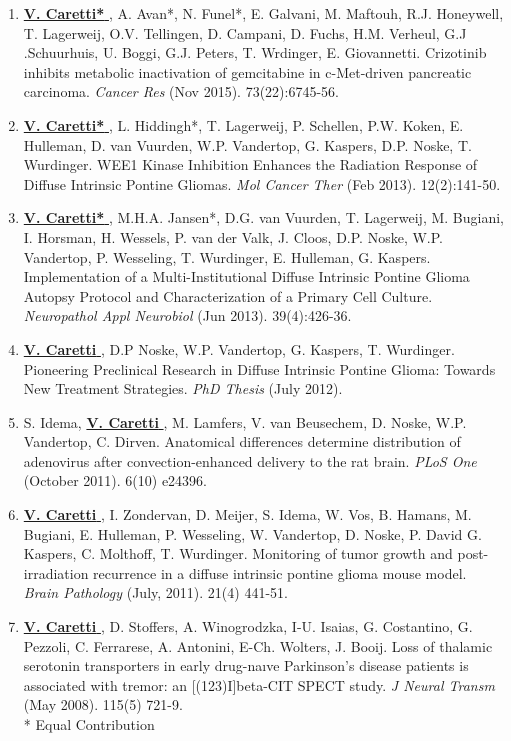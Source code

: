 \documentclass[line,margin]{res}
\newcommand{\namestyle}[1]{\underline{\bf #1 }}
\begin{document}
\begin{resume}
{\begin{enumerate}
\item \namestyle{V. Caretti*}, A. Avan*, N. Funel*, E. Galvani, M. Maftouh, R.J. Honeywell, T. Lagerweij, O.V. Tellingen, D. Campani, D. Fuchs, H.M. Verheul, G.J .Schuurhuis, U. Boggi, G.J. Peters, T. Wrdinger, E. Giovannetti. Crizotinib inhibits metabolic inactivation of gemcitabine in c-Met-driven pancreatic carcinoma. \emph{Cancer Res} (Nov 2015). 73(22):6745-56.
\item \namestyle{V. Caretti*}, L. Hiddingh*, T. Lagerweij, P. Schellen, P.W. Koken, E. Hulleman, D. van Vuurden, W.P. Vandertop, G. Kaspers, D.P. Noske, T. Wurdinger. WEE1 Kinase Inhibition Enhances the Radiation Response of Diffuse Intrinsic Pontine Gliomas. \emph{Mol Cancer Ther} (Feb 2013). 12(2):141-50.
\item \namestyle{V. Caretti*}, M.H.A. Jansen*, D.G. van Vuurden, T. Lagerweij, M. Bugiani, I. Horsman, H. Wessels, P. van der Valk, J. Cloos, D.P. Noske, W.P. Vandertop, P. Wesseling, T. Wurdinger, E. Hulleman, G. Kaspers. Implementation of a Multi-Institutional Diffuse Intrinsic Pontine Glioma Autopsy Protocol and Characterization of a Primary Cell Culture. \emph{Neuropathol Appl Neurobiol} (Jun 2013). 39(4):426-36.
\item \namestyle{V. Caretti}, D.P Noske, W.P. Vandertop, G. Kaspers, T. Wurdinger. Pioneering Preclinical Research in Diffuse Intrinsic Pontine Glioma: Towards New Treatment Strategies. \emph{PhD Thesis} (July 2012).
\item S. Idema, \namestyle{V. Caretti}, M. Lamfers, V. van Beusechem, D. Noske, W.P. Vandertop, C. Dirven. Anatomical differences determine distribution of adenovirus after convection-enhanced delivery to the rat brain. \emph{PLoS One} (October 2011). 6(10) e24396.
\item \namestyle{V. Caretti}, I. Zondervan, D. Meijer, S. Idema, W. Vos, B. Hamans, M. Bugiani, E. Hulleman, P. Wesseling, W. Vandertop, D. Noske, P. David G. Kaspers, C. Molthoff, T. Wurdinger. Monitoring of tumor growth and post-irradiation recurrence in a diffuse intrinsic pontine glioma mouse model. \emph{Brain Pathology} (July, 2011). 21(4) 441-51.
\item \namestyle{V. Caretti}, D. Stoffers, A. Winogrodzka, I-U. Isaias, G. Costantino, G. Pezzoli, C. Ferrarese, A. Antonini, E-Ch. Wolters, J. Booij. Loss of thalamic serotonin transporters in early drug-naıve Parkinson’s disease patients is associated with tremor: an [(123)I]beta-CIT SPECT study. \emph{J Neural Transm} (May 2008). 115(5) 721-9.
\\ {* Equal Contribution}
\end{enumerate}
}


\end{resume}
\end{document}

